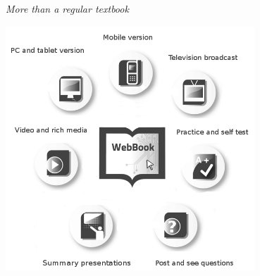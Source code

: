
\newpage
\thispagestyle{empty}

{\normalfont\sffamily\fontsize{22}\normalfont\itshape More than a regular textbook} \par

\begin{center}
\includegraphics[width=0.70\textwidth]{../title_images/morethantextbook.png}
\end{center}

